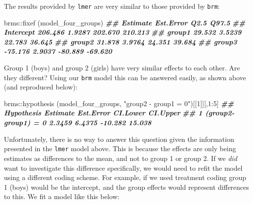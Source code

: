 \documentclass[
]{book}
\newenvironment{Shaded}{\begin{snugshade}}{\end{snugshade}}
\newcommand{\DecValTok}[1]{\textcolor[rgb]{0.00,0.00,0.81}{#1}}
\newcommand{\DocumentationTok}[1]{\textcolor[rgb]{0.56,0.35,0.01}{\textbf{\textit{#1}}}}
\newcommand{\FunctionTok}[1]{\textcolor[rgb]{0.00,0.00,0.00}{#1}}
\newcommand{\NormalTok}[1]{#1}
\newcommand{\SpecialCharTok}[1]{\textcolor[rgb]{0.00,0.00,0.00}{#1}}
\newcommand{\StringTok}[1]{\textcolor[rgb]{0.31,0.60,0.02}{#1}}
\begin{document}
The results provided by \texttt{lmer} are very similar to those provided by \texttt{brm}:

\begin{Shaded}
\begin{Highlighting}[]
\NormalTok{brms}\SpecialCharTok{::}\FunctionTok{fixef}\NormalTok{ (model\_four\_groups)}
\DocumentationTok{\#\#           Estimate Est.Error    Q2.5   Q97.5}
\DocumentationTok{\#\# Intercept  206.486    1.9287 202.670 210.213}
\DocumentationTok{\#\# group1      29.532    3.5239  22.783  36.645}
\DocumentationTok{\#\# group2      31.878    3.9764  24.351  39.684}
\DocumentationTok{\#\# group3     {-}75.176    2.9037 {-}80.889 {-}69.620}
\end{Highlighting}
\end{Shaded}

Group 1 (boys) and group 2 (girls) have very similar effects to each other. Are they different? Using our \texttt{brm} model this can be answered easily, as shown above (and reproduced below):

\begin{Shaded}
\begin{Highlighting}[]
\NormalTok{brms}\SpecialCharTok{::}\FunctionTok{hypothesis}\NormalTok{ (model\_four\_groups, }\StringTok{"group2 {-} group1 = 0"}\NormalTok{)[[}\DecValTok{1}\NormalTok{]][,}\DecValTok{1}\SpecialCharTok{:}\DecValTok{5}\NormalTok{]}
\DocumentationTok{\#\#            Hypothesis Estimate Est.Error CI.Lower CI.Upper}
\DocumentationTok{\#\# 1 (group2{-}group1) = 0   2.3459    6.4375  {-}10.282   15.038}
\end{Highlighting}
\end{Shaded}

Unfortunately, there is no way to answer this question given the information presented in the \texttt{lmer} model above. This is because the effects are only being estimates as differences to the mean, and not to group 1 or group 2. If we \emph{did} want to investigate this difference specifically, we would need to refit the model using a different coding scheme. For example, if we used treatment coding group 1 (boys) would be the intercept, and the group effects would represent differences to this. We fit a model like this below:
\end{document}
